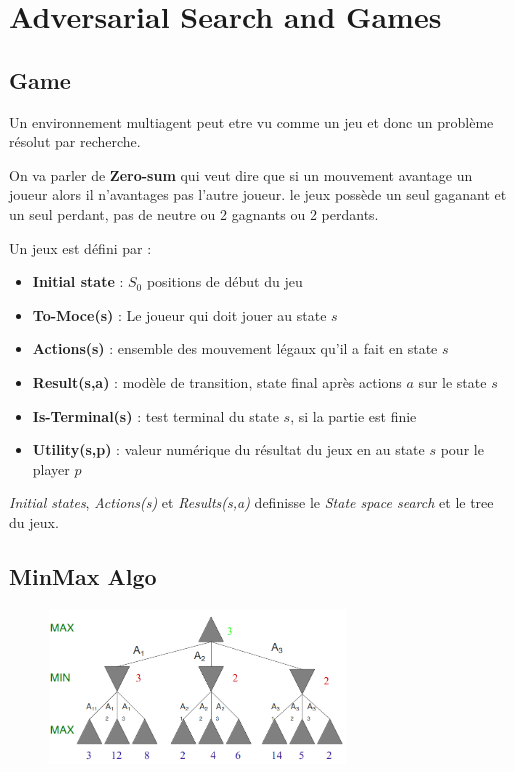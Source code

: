 			
\section{Adversarial Search and Games}
	\subsection{Game}
		Un environnement multiagent peut etre vu comme un jeu et donc un problème résolut par recherche.
		
		On va parler de \textbf{Zero-sum} qui veut dire que si un mouvement avantage un joueur alors il n'avantages pas l'autre joueur. le jeux possède un seul gaganant et un seul perdant, pas de neutre ou 2 gagnants ou 2 perdants.
		
		
		Un jeux est défini par :
		\begin{itemize}
			\item \textbf{Initial state} : $S_0$ positions de début du jeu
			\item \textbf{To-Moce(s)} : Le joueur qui doit jouer au state $s$
			\item \textbf{Actions(s)} : ensemble des mouvement légaux qu'il a fait en state $s$
			\item \textbf{Result(s,a)} : modèle de transition, state final après actions $a$ sur le state $s$
			\item \textbf{Is-Terminal(s)} : test terminal du state $s$, si la partie est finie
			\item \textbf{Utility(s,p)} :  valeur numérique du résultat du jeux  en au state $s$ pour le player $p$
		\end{itemize}	
		
		
		\textit{Initial states}, \textit{Actions(s)} et \textit{Results(s,a)} definisse le \textit{State space search} et le tree du jeux.
	\subsection{MinMax Algo}
	
		\begin{figure}[htp]
			\centering
			\includegraphics[width=0.7\textwidth]{img/minmax.png}
		\end{figure}
		
